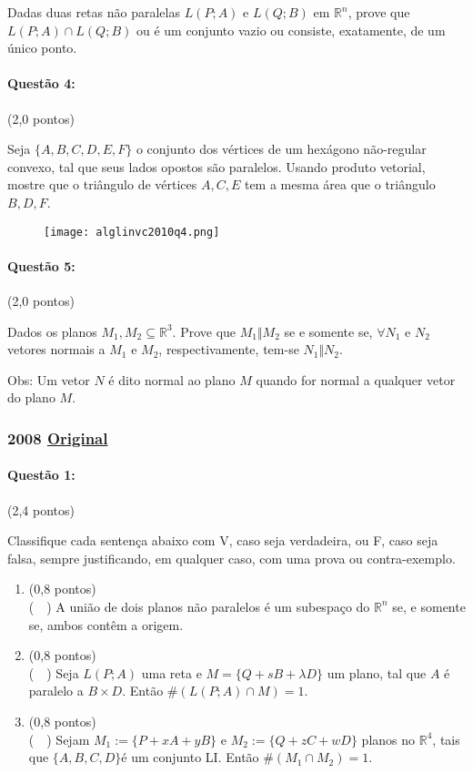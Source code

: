 \documentclass[12pt,a4paper]{article}
\newcommand{\original}[1]{\tiny \href{#1}{Original} \normalsize}
\begin{document}
Dadas duas retas não paralelas $L(P;A)$ e $L(Q;B)$ em $\mathbb{R}^n$, prove que $L(P;A) \cap L(Q;B)$ ou é um conjunto vazio ou consiste, exatamente, de um único ponto.

\paragraph{Questão 4:} (2,0 pontos)

Seja $\{A,B,C,D,E,F\}$ o conjunto dos vértices de um hexágono não-regular convexo, tal que seus lados opostos são paralelos. Usando produto vetorial, mostre que o triângulo de vértices $A,C,E$ tem a mesma área que o triângulo $B,D,F$.

\begin{figure}[h]\centering\texttt{[image: alglinvc2010q4.png]}\end{figure}

\paragraph{Questão 5:} (2,0 pontos)

Dados os planos $M_1,M_2 \subseteq \mathbb{R}^3$. Prove que $M_1 \Vert M_2$ se e somente se, $\forall N_1$ e $N_2$ vetores normais a $M_1$ e $M_2$, respectivamente, tem-se $N_1 \Vert N_2$.

Obs: Um vetor $N$ é dito normal ao plano $M$ quando for normal a qualquer vetor do plano $M$.
\normalsize
\newpage
\subsubsection{2008 \original{https://drive.google.com/file/d/1ODHXkowN2YzVkhZNm0lSGx1qZDRCdHnl/view?usp=sharing}}

\paragraph{Questão 1:} (2,4 pontos) 

Classifique cada sentença abaixo com V, caso seja verdadeira, ou F, caso seja falsa, sempre justificando, em qualquer caso, com uma prova ou contra-exemplo.

\begin{enumerate}[label=(\alph*)]
\item  (0,8 pontos) \\
(\ \  ) A união de dois planos não paralelos é um subespaço do $\mathbb{R}^n$ se, e somente se, ambos contêm a origem. 
\item (0,8 pontos) \\
(\ \  ) Seja $L(P;A)$ uma reta e $M=\{Q+sB+\lambda D \}$ um plano, tal que $A$ é paralelo a $B\times D$. Então $\#(L(P;A)\cap M)=1$.
\item (0,8 pontos) \\
(\ \  ) Sejam $M_1 := \{P+xA+yB\}$ e $M_2 := \{Q+zC+wD\}$ planos no $\mathbb{R}^4$, tais que $\{A,B,C,D\}$é um conjunto LI. Então $\#(M_1 \cap M_2)=1$.
\end{enumerate}
\end{document}
